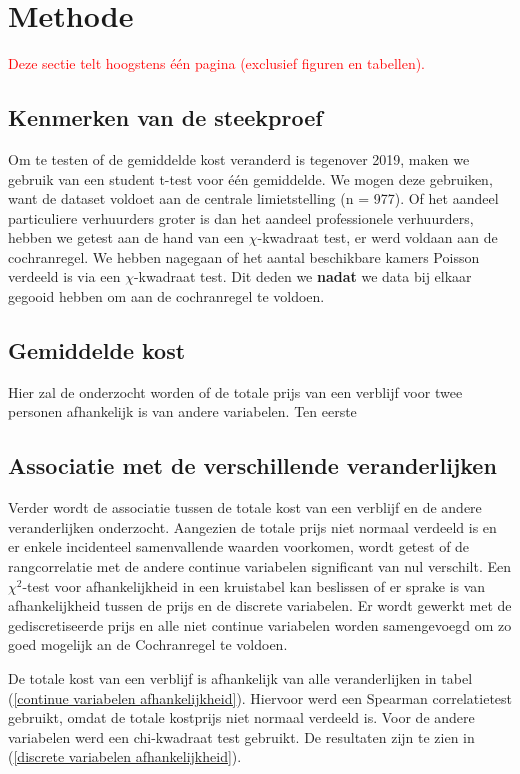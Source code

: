 \documentclass[a4paper]{kulakarticle}
\newcommand{\rood}[1]{\textcolor{red}{#1}}
\begin{document}
	\section{Methode}
	\rood{Deze sectie telt hoogstens één pagina (exclusief figuren en tabellen).}
	\subsection{Kenmerken van de steekproef}
Om te testen of de gemiddelde kost veranderd is tegenover 2019, maken we gebruik van een student t-test voor één gemiddelde. We mogen deze gebruiken, want de dataset voldoet aan de centrale limietstelling (n = 977). Of het aandeel particuliere verhuurders groter is dan het aandeel professionele verhuurders, hebben we getest aan de hand van een $\chi$-kwadraat test, er werd voldaan aan de cochranregel. We hebben nagegaan of het aantal beschikbare kamers Poisson verdeeld is via een $\chi$-kwadraat test. Dit deden we \textbf{nadat} we data bij elkaar gegooid hebben om aan de cochranregel te voldoen.
	
	\subsection{Gemiddelde kost}
	
	Hier zal de onderzocht worden of de totale prijs van een verblijf voor twee personen afhankelijk is van andere variabelen. Ten eerste 
	

	\subsection{Associatie met de verschillende veranderlijken}
	
	Verder wordt de associatie tussen de totale kost van een verblijf en de andere veranderlijken onderzocht. Aangezien de totale prijs niet normaal verdeeld is en er enkele incidenteel samenvallende waarden voorkomen, wordt getest of de rangcorrelatie met de andere continue variabelen significant van nul verschilt. Een $\chi ^2$-test voor afhankelijkheid in een kruistabel kan beslissen of er sprake is van afhankelijkheid tussen de prijs en de discrete variabelen. Er wordt gewerkt met de gediscretiseerde prijs en alle niet continue variabelen worden samengevoegd om zo goed mogelijk an de Cochranregel te voldoen. 
	
	
	De totale kost van een verblijf is afhankelijk van alle veranderlijken in tabel (\ref{continue variabelen afhankelijkheid}). Hiervoor werd een Spearman correlatietest gebruikt, omdat de totale kostprijs niet normaal verdeeld is. Voor de andere variabelen werd een chi-kwadraat test gebruikt. De resultaten zijn te zien in (\ref{discrete variabelen afhankelijkheid}).
	
\end{document}

